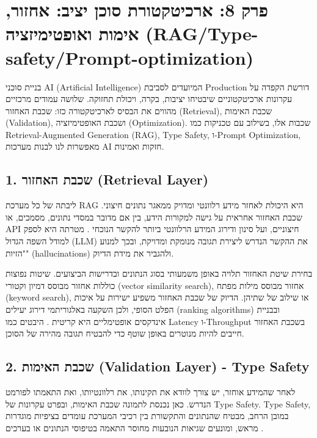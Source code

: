 \section{פרק 8: ארכיטקטורת סוכן יציב: אחזור, אימות ואופטימיזציה (RAG/Type-safety/Prompt-optimization)}

בניית סוכני AI (Artificial Intelligence) המיועדים לסביבת Production דורשת הקפדה על עקרונות ארכיטקטוניים שיבטיחו יציבות, בקרה, ויכולת תחזוקה. שלושה עמודים מרכזיים מהווים את הבסיס לארכיטקטורה כזו: שכבת האחזור (Retrieval), שכבת האימות (Validation), ושכבת האופטימיזציה (Optimization). שכבות אלו, בשילוב עם טכניקות כמו Retrieval-Augmented Generation (RAG), Type Safety, ו-Prompt Optimization, מאפשרות לנו לבנות מערכות AI חזקות ואמינות.

\subsection{1. שכבת האחזור (Retrieval Layer)}

ליבתה של כל מערכת RAG היא היכולת לאחזר מידע רלוונטי ומדויק ממאגר נתונים חיצוני. שכבת האחזור אחראית על גישה למקורות הידע, בין אם מדובר במסדי נתונים, מסמכים, או API חיצוניים, ועל סינון ודירוג המידע הרלוונטי ביותר להקשר הנוכחי \cite{Reger2026}. מטרתה היא לספק למודל השפה הגדול (LLM) את ההקשר הנדרש ליצירת תגובה מנומקת ומדויקת, ובכך למנוע "הזיות" (hallucinations) ולהגביר את מידת הדיוק.

בחירת שיטת האחזור תלויה באופן משמעותי בסוג הנתונים ובדרישות הביצועים. שיטות נפוצות כוללות אחזור מבוסס דמיון וקטורי (vector similarity search), אחזור מבוסס מילות מפתח (keyword search), או שילוב של שתיהן. הדיוק של שכבת האחזור משפיע ישירות על איכות הפלט הסופי, ולכן השקעה באלגוריתמי דירוג יעילים (ranking algorithms) ובבניית אינדקסים אופטימליים היא קריטית \cite{Reger2026}. היבטים כמו Latency ו-Throughput בשכבת האחזור חייבים להיות מנוטרים באופן שוטף כדי להבטיח תגובה מהירה של הסוכן.

\subsection{2. שכבת האימות (Validation Layer) - Type Safety}

לאחר שהמידע אוחזר, יש צורך לוודא את תקינותו, את רלוונטיותו, ואת התאמתו לפורמט הנדרש. כאן נכנסת לתמונה שכבת האימות, ובפרט עקרונות של Type Safety. Type Safety, במובן הרחב, מבטיח שהנתונים והתקשורת בין רכיבי המערכת עומדים בציפיות מוגדרות מראש, ומונעים שגיאות הנובעות מחוסר התאמה בטיפוסי הנתונים או בערכים \cite{Reger2026}.

